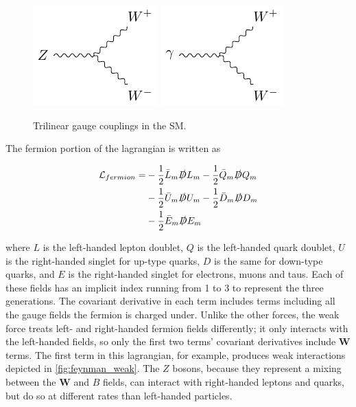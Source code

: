 \begin{centering}
\begin{figure}[!hbt]
\myfloatalign
\includegraphics[width=.45\linewidth]{feynman/tlgc_z.pdf}
\includegraphics[width=.45\linewidth]{feynman/tlgc_g.pdf}
\caption{Trilinear gauge couplings in the \ac{SM}.}
\label{fig:tlgc}
\end{figure}
\end{centering}

The fermion portion of the lagrangian is written as

\begin{equation}
\begin{split}
\mathcal{L}_{fermion} = & -\frac{1}{2}\bar{L}_m\slashed{D}L_m -\frac{1}{2}\bar{Q}_m\slashed{D}Q_m \\
						& -\frac{1}{2}\bar{U}_m\slashed{D}U_m -\frac{1}{2}\bar{D}_m\slashed{D}D_m \\
						& -\frac{1}{2}\bar{E}_m\slashed{D}E_m \\
\end{split}
\end{equation}

where $L$ is the left-handed lepton doublet, $Q$ is the left-handed quark doublet, $U$ is the right-handed singlet for up-type quarks, $D$ is the same for down-type quarks, and $E$ is the right-handed singlet for electrons, muons and taus. Each of these fields has an implicit index running from 1 to 3 to represent the three generations. The covariant derivative in each term includes terms including all the gauge fields the fermion is charged under. Unlike the other forces, the weak force treats left- and right-handed fermion fields differently; it only interacts with the left-handed fields, so only the first two terms' covariant derivatives include $\bm{W}$ terms. The first term in this lagrangian, for example, produces weak interactions depicted in \autoref{fig:feynman_weak}. The $Z$ bosons, because they represent a mixing between the $\bm{W}$ and $B$ fields, can interact with right-handed leptons and quarks, but do so at different rates than left-handed particles.

